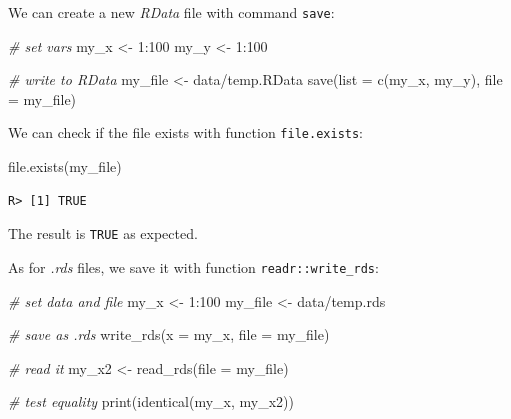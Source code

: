\documentclass[
  12pt,
]{book}
\newenvironment{Shaded}{\begin{snugshade}}{\end{snugshade}}
\newcommand{\AttributeTok}[1]{\textcolor[rgb]{0.61,0.61,0.61}{#1}}
\newcommand{\CommentTok}[1]{\textcolor[rgb]{0.37,0.37,0.37}{\textit{#1}}}
\newcommand{\DecValTok}[1]{\textcolor[rgb]{0.06,0.06,0.06}{#1}}
\newcommand{\FunctionTok}[1]{\textcolor[rgb]{0,0,0}{#1}}
\newcommand{\NormalTok}[1]{#1}
\newcommand{\OtherTok}[1]{\textcolor[rgb]{0.37,0.37,0.37}{#1}}
\newcommand{\SpecialCharTok}[1]{\textcolor[rgb]{0,0,0}{#1}}
\newcommand{\StringTok}[1]{\textcolor[rgb]{0.5,0.5,0.5}{#1}}
\begin{document}
We can create a new \emph{RData} file with command \texttt{save}:

\begin{Shaded}
\begin{Highlighting}[]
\CommentTok{\# set vars}
\NormalTok{my\_x }\OtherTok{\textless{}{-}} \DecValTok{1}\SpecialCharTok{:}\DecValTok{100}
\NormalTok{my\_y }\OtherTok{\textless{}{-}} \DecValTok{1}\SpecialCharTok{:}\DecValTok{100}

\CommentTok{\# write to RData}
\NormalTok{my\_file }\OtherTok{\textless{}{-}} \StringTok{\textquotesingle{}data/temp.RData\textquotesingle{}}
\FunctionTok{save}\NormalTok{(}\AttributeTok{list =} \FunctionTok{c}\NormalTok{(}\StringTok{\textquotesingle{}my\_x\textquotesingle{}}\NormalTok{, }\StringTok{\textquotesingle{}my\_y\textquotesingle{}}\NormalTok{),}
     \AttributeTok{file =}\NormalTok{ my\_file)}
\end{Highlighting}
\end{Shaded}

We can check if the file exists with function \texttt{file.exists}:

\begin{Shaded}
\begin{Highlighting}[]
\FunctionTok{file.exists}\NormalTok{(my\_file)}
\end{Highlighting}
\end{Shaded}

\begin{verbatim}
R> [1] TRUE
\end{verbatim}

The result is \texttt{TRUE} as expected.

As for \emph{.rds} files, we save it with function \texttt{readr::write\_rds}:

\begin{Shaded}
\begin{Highlighting}[]
\CommentTok{\# set data and file}
\NormalTok{my\_x }\OtherTok{\textless{}{-}} \DecValTok{1}\SpecialCharTok{:}\DecValTok{100}
\NormalTok{my\_file }\OtherTok{\textless{}{-}} \StringTok{\textquotesingle{}data/temp.rds\textquotesingle{}}

\CommentTok{\# save as .rds}
\FunctionTok{write\_rds}\NormalTok{(}\AttributeTok{x =}\NormalTok{ my\_x,}
          \AttributeTok{file =}\NormalTok{ my\_file)}

\CommentTok{\# read it}
\NormalTok{my\_x2 }\OtherTok{\textless{}{-}} \FunctionTok{read\_rds}\NormalTok{(}\AttributeTok{file =}\NormalTok{ my\_file)}

\CommentTok{\# test equality}
\FunctionTok{print}\NormalTok{(}\FunctionTok{identical}\NormalTok{(my\_x, my\_x2))}
\end{Highlighting}
\end{Shaded}
\end{document}
